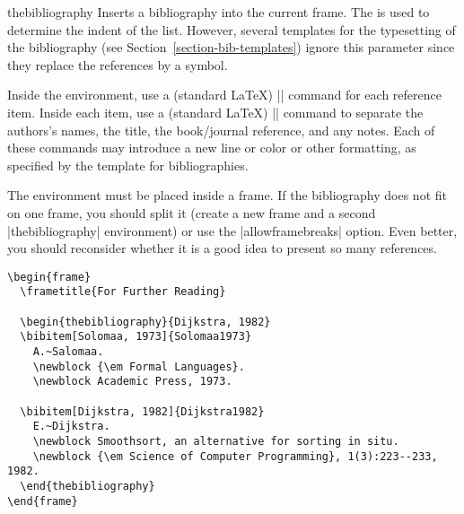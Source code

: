 \begin{environment}{{thebibliography}}
  Inserts a bibliography into the current frame. The  is used to determine the indent of the list. However,
  several templates for the typesetting of the bibliography (see
  Section~\ref{section-bib-templates}) ignore this 
  parameter since they replace the references by a symbol.

  Inside the environment, use a (standard \LaTeX) |\bibitem| command
  for each reference item. Inside each item, use a (standard \LaTeX)
  |\newblock| command to separate the authors's names, the title, the
  book/journal reference, and any notes. Each of these commands may
  introduce a new line or color or other formatting, as specified by
  the template for bibliographies.

  The environment must be placed inside a frame. If the bibliography
  does not fit on one frame, you should 
  split it (create a new frame and a second |thebibliography|
  environment) or use the |allowframebreaks| option. Even better, you
  should reconsider whether it is a good idea to present so many
  references. 
  \example
\begin{verbatim}
\begin{frame}
  \frametitle{For Further Reading}

  \begin{thebibliography}{Dijkstra, 1982}
  \bibitem[Solomaa, 1973]{Solomaa1973}
    A.~Salomaa.
    \newblock {\em Formal Languages}.
    \newblock Academic Press, 1973.

  \bibitem[Dijkstra, 1982]{Dijkstra1982}
    E.~Dijkstra.
    \newblock Smoothsort, an alternative for sorting in situ.
    \newblock {\em Science of Computer Programming}, 1(3):223--233, 1982.
  \end{thebibliography}
\end{frame}
\end{verbatim}
\end{environment}



